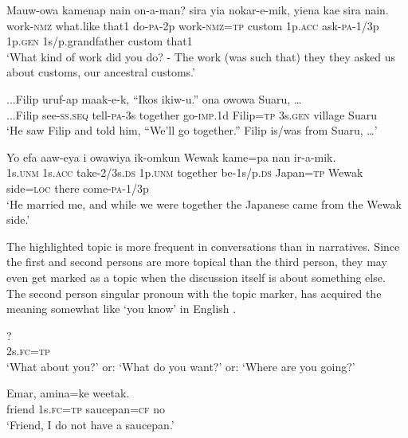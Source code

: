\ea%
\label{ex:x1680}
\gll Mauw-owa  kamenap  nain  on-a-man?   sira  yia  nokar-e-mik,  yiena  kae  sira nain.\\
work-\textsc{nmz}  what.like  that1  do-\textsc{pa}-2p  work-\textsc{nmz}=\textsc{tp} custom  1p.\textsc{acc}  ask-\textsc{pa}-1/3p  1p.\textsc{gen}  1s/p.grandfather  custom that1    \\
\glt`What kind of work did you do? - The work (was such that) they they asked us about customs, our ancestral customs.'
\z


\ea%
\label{ex:x1678}
\gll ...Filip  uruf-ap  maak-e-k,  ``Ikos  ikiw-u.''   ona  owowa  Suaru,  {\dots}\\
...Filip  see-\textsc{ss}.\textsc{seq}  tell-\textsc{pa}-3s  together  go-\textsc{imp}.1d  Filip=\textsc{tp} 3s.\textsc{gen}  village  Suaru     \\
\glt`He saw Filip and told him, ``We'll go together.'' Filip is/was from Suaru, {\dots}'
\z


\ea%
\label{ex:x1679}
\gll Yo  efa  aaw-eya  i  owawiya  ik-omkun   Wewak  kame=pa  nan  ir-a-mik. \\
1s.\textsc{unm}  1s.\textsc{acc}  take-2/3s.\textsc{ds}  1p.\textsc{unm}  together  be-1s/p.\textsc{ds} Japan=\textsc{tp}  Wewak  side=\textsc{loc}  there  come-\textsc{pa}-1/3p     \\
\glt`He married me, and while we were together the Japanese came from the Wewak side.'
\z


The highlighted topic is more frequent in conversations than in narratives. Since the first and second persons are more topical than the third person, they may even get marked as a topic when the discussion itself is about something else. The second person singular pronoun with the topic marker,  has acquired the meaning somewhat like `you know' in English .

\ea%
\label{ex:x1684}
\gll {}? \\
2s.\textsc{fc}=\textsc{tp}      \\
\glt`What about you?' or: `What do you want?' or: `Where are you going?'
\z


\ea%
\label{ex:x1685}
\gll Emar,    amina=ke  weetak. \\
friend  1s.\textsc{fc}=\textsc{tp}  saucepan=\textsc{cf}  no      \\
\glt`Friend, I do not have a saucepan.'
\z


